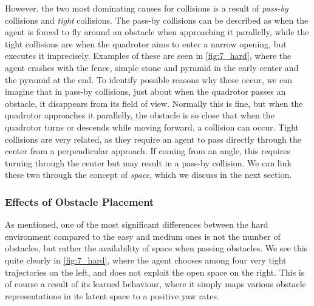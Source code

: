 However, the two most dominating causes for collisions is a result of \textit{pass-by} collisions and \textit{tight} collisions. The pass-by collisions can be described as when the agent is forced to fly around an obstacle when approaching it parallelly, while the tight collisions are when the quadrotor aims to enter a narrow opening, but executes it imprecisely. Examples of these are seen in \cref{fig:7_hard}, where the agent crashes with the fence, simple stone and pyramid in the early center and the pyramid at the end. To identify possible reasons why these occur, we can imagine that in pass-by collisions, just about when the quadrotor passes an obstacle, it disappears from its field of view. Normally this is fine, but when the quadrotor approaches it parallelly, the obstacle is so close that when the quadrotor turns or descends while moving forward, a collision can occur. Tight collisions are very related, as they require an agent to pass directly through the center from a perpendicular approach. If coming from an angle, this requires turning through the center but may result in a pass-by collision.
We can link these two through the concept of \textit{space}, which we discuss in the next section.


\subsubsection{Effects of Obstacle Placement}
As mentioned, one of the most significant differences between the hard environment compared to the easy and medium ones is not the number of obstacles, but rather the availability of space when passing obstacles. We see this quite clearly in \cref{fig:7_hard}, where the agent chooses among four very tight trajectories on the left, and does not exploit the open space on the right. This is of course a result of its learned behaviour, where it simply maps various obstacle representations in its latent space to a positive yaw rates.


